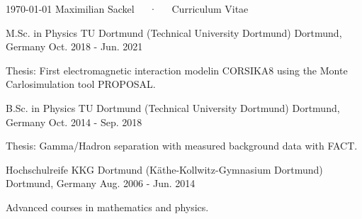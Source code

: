\documentclass[11pt, a4paper]{Awesome-CV/awesome-cv}
\begin{document}
\makecvheader

\makecvfooter
{\today}
{Maximilian Sackel~~~·~~~Curriculum Vitae}
{\thepage}



\begin{cventries}
    \cventry
    {M.Sc. in Physics} %
    {TU Dortmund (Technical University Dortmund)} %
    {Dortmund, Germany} %
    {Oct. 2018 - Jun. 2021} %
    {
        \begin{cvitems} %
        \item {Thesis: First electromagnetic interaction modelin CORSIKA8 using the Monte Carlosimulation tool PROPOSAL.}
        \end{cvitems}
    }%

    \cventry
    {B.Sc. in Physics} %
    {TU Dortmund (Technical University Dortmund)} %
    {Dortmund, Germany} %
    {Oct. 2014 - Sep. 2018} %
    {
        \begin{cvitems} %
        \item {Thesis: Gamma/Hadron separation with measured background data with FACT.}
        \end{cvitems}
    }%

    \cventry
    {Hochschulreife} %
    {KKG Dortmund (Käthe-Kollwitz-Gymnasium Dortmund)} %
    {Dortmund, Germany} %
    {Aug. 2006 - Jun. 2014} %
    {
        \begin{cvitems} %
        \item {Advanced courses in mathematics and physics.}
        \end{cvitems}
    }%
\end{cventries}
\end{document}

